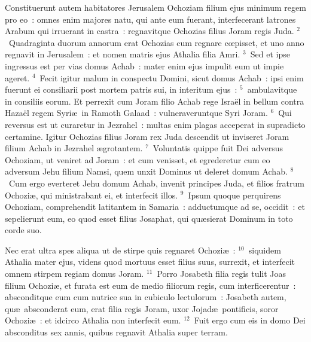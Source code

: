 \bchapter
\lettrine[lines=3,image=true,loversize=0.05,lraise=-0.03]{C}{}onstituerunt autem habitatores Jerusalem Ochoziam filium ejus minimum regem pro eo~: omnes enim majores natu, qui ante eum fuerant, interfecerant latrones Arabum qui irruerant in castra~: regnavitque Ochozias filius Joram regis Juda.
${}^{2}$~Quadraginta duorum annorum erat Ochozias cum regnare cœpisset, et uno anno regnavit in Jerusalem~: et nomen matris ejus Athalia filia Amri.
${}^{3}$~Sed et ipse ingressus est per vias domus Achab~: mater enim ejus impulit eum ut impie ageret.
${}^{4}$~Fecit igitur malum in conspectu Domini, sicut domus Achab~: ipsi enim fuerunt ei consiliarii post mortem patris sui, in interitum ejus~:
${}^{5}$~ambulavitque in consiliis eorum. Et perrexit cum Joram filio Achab rege Isra\"el in bellum contra Haza\"el regem Syri\ae\ in Ramoth Galaad~: vulneraveruntque Syri Joram.
${}^{6}$~Qui reversus est ut curaretur in Jezrahel~: multas enim plagas acceperat in supradicto certamine. Igitur Ochozias filius Joram rex Juda descendit ut inviseret Joram filium Achab in Jezrahel \ae grotantem.
${}^{7}$~Voluntatis quippe fuit Dei adversus Ochoziam, ut veniret ad Joram~: et cum venisset, et egrederetur cum eo adversum Jehu filium Namsi, quem unxit Dominus ut deleret domum Achab.
${}^{8}$~Cum ergo everteret Jehu domum Achab, invenit principes Juda, et filios fratrum Ochozi\ae , qui ministrabant ei, et interfecit illos.
${}^{9}$~Ipsum quoque perquirens Ochoziam, comprehendit latitantem in Samaria~: adductumque ad se, occidit~: et sepelierunt eum, eo quod esset filius Josaphat, qui qu\ae sierat Dominum in toto corde suo.

 Nec erat ultra spes aliqua ut de stirpe quis regnaret Ochozi\ae~:
${}^{10}$~siquidem Athalia mater ejus, videns quod mortuus esset filius suus, surrexit, et interfecit omnem stirpem regiam domus Joram.
${}^{11}$~Porro Josabeth filia regis tulit Joas filium Ochozi\ae , et furata est eum de medio filiorum regis, cum interficerentur~: absconditque eum cum nutrice sua in cubiculo lectulorum~: Josabeth autem, qu\ae\ absconderat eum, erat filia regis Joram, uxor Jojad\ae\ pontificis, soror Ochozi\ae~: et idcirco Athalia non interfecit eum.
${}^{12}$~Fuit ergo cum eis in domo Dei absconditus sex annis, quibus regnavit Athalia super terram.


